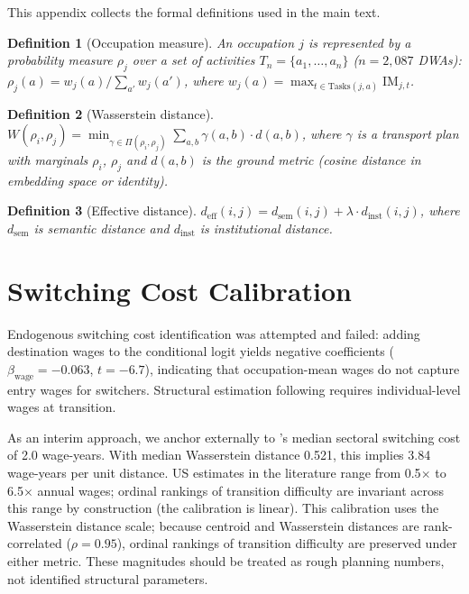 \documentclass[12pt]{article}
\newtheorem{definition}{Definition}[section]
\begin{document}
This appendix collects the formal definitions used in the main text.

\begin{definition}[Occupation measure]
An occupation $j$ is represented by a probability measure $\rho_j$ over a set of activities $T_n = \{a_1, \ldots, a_n\}$ ($n = 2{,}087$ DWAs): $\rho_j(a) = w_j(a) / \sum_{a'} w_j(a')$, where $w_j(a) = \max_{t \in \mathrm{Tasks}(j,a)} \mathrm{IM}_{j,t}$.
\end{definition}

\begin{definition}[Wasserstein distance]
\label{def:wasserstein}
$W(\rho_i, \rho_j) = \min_{\gamma \in \Pi(\rho_i, \rho_j)} \sum_{a,b} \gamma(a,b) \cdot d(a,b)$,
where $\gamma$ is a transport plan with marginals $\rho_i$, $\rho_j$ and $d(a,b)$ is the ground metric (cosine distance in embedding space or identity).
\end{definition}

\begin{definition}[Effective distance]
\label{def:effective-distance}
$d_{\mathrm{eff}}(i,j) = d_{\mathrm{sem}}(i,j) + \lambda \cdot d_{\mathrm{inst}}(i,j)$,
where $d_{\mathrm{sem}}$ is semantic distance and $d_{\mathrm{inst}}$ is institutional distance.
\end{definition}


\section{Switching Cost Calibration}
\label{app:switching-costs}

Endogenous switching cost identification was attempted and failed: adding destination wages to the conditional logit yields negative coefficients ($\beta_{\mathrm{wage}} = -0.063$, $t = -6.7$), indicating that occupation-mean wages do not capture entry wages for switchers. Structural estimation following \citet{Traiberman2019} requires individual-level wages at transition.

As an interim approach, we anchor externally to \citet{DixCarneiro2014}'s median sectoral switching cost of 2.0 wage-years. With median Wasserstein distance 0.521, this implies 3.84 wage-years per unit distance. US estimates in the literature range from 0.5$\times$ to 6.5$\times$ annual wages; ordinal rankings of transition difficulty are invariant across this range by construction (the calibration is linear). This calibration uses the Wasserstein distance scale; because centroid and Wasserstein distances are rank-correlated ($\rho = 0.95$), ordinal rankings of transition difficulty are preserved under either metric. These magnitudes should be treated as rough planning numbers, not identified structural parameters.
\end{document}
